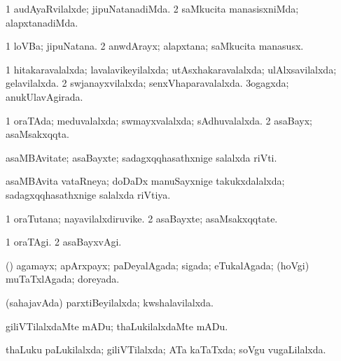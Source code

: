 \bentry
{} 
\gl{\kirxvi}
\expl{}
\bmng
\bnum
\num{1} audAyaRvilalxde; jipuNatanadiMda. 
\num{2} saMkucita manasisxniMda; alapxtanadiMda. 
\enum
\emng
\eentry

\bentry
{} 
\gl{\nA}
\expl{}
\bmng
\bnum
\num{1} loVBa; jipuNatana. 
\num{2} anwdArayx; alapxtana; saMkucita manasusx. 
\enum
\emng
\eentry

\bentry
{} 
\gl{\gu}
\expl{}
\bmng
\bnum
\num{1} hitakaravalalxda; lavalavikeyilalxda; utAsxhakaravalalxda; ulAlxsavilalxda; gelavilalxda. 
\num{2} swjanayxvilalxda; senxVhaparavalalxda. 
\num{3}ogagxda; anukUlavAgirada. 
\enum
\emng
\eentry

\bentry
{} 
\gl{\gu}
\expl{}
\bmng
\bnum
\num{1} oraTAda; meduvalalxda; swmayxvalalxda; sAdhuvalalxda. 
\num{2} asaBayx; asaMsakxqqta. 
\enum
\emng
\eentry

\bentry
{} 
\gl{\nA}
\expl{}
\bmng
 asaMBAvitate; asaBayxte; sadagxqqhasathxnige salalxda riVti. 
\emng
\eentry

\bentry
{} 
\gl{\gu}
\expl{}
\bmng
 asaMBAvita vataRneya; doDaDx manuSayxnige takukxdalalxda; sadagxqqhasathxnige salalxda riVtiya. 
\emng
\eentry

\bentry
{} 
\gl{\nA}
\expl{}
\bmng
\bnum
\num{1} oraTutana; nayavilalxdiruvike. 
\num{2} asaBayxte; asaMsakxqqtate. 
\enum
\emng
\eentry

\bentry
{} 
\gl{\kirxvi}
\bmng
\bnum
\num{1} oraTAgi. 
\num{2} asaBayxvAgi. 
\enum
\emng
\eentry

\bentry
{} 
\gl{\gu}
\expl{}
\bmng
 (\AmA) agamayx; apArxpayx; paDeyalAgada; sigada; eTukalAgada; (hoVgi) muTaTxlAgada; doreyada. 
\emng
\eentry

\bentry
{} 
\gl{\gu}
\expl{}
\bmng
 (sahajavAda) parxtiBeyilalxda; kwshalavilalxda. 
\emng
\eentry

\bentry
{} 
\gl{\akirx}
\expl{}
\bmng
 giliVTilalxdaMte mADu; thaLukilalxdaMte mADu. 
\emng
\eentry

\bentry
{} 
\gl{\gu}
\expl{}
\bmng
 thaLuku paLukilalxda; giliVTilalxda; ATa kaTaTxda; soVgu \mo vugaLilalxda. 
\emng
\eentry


